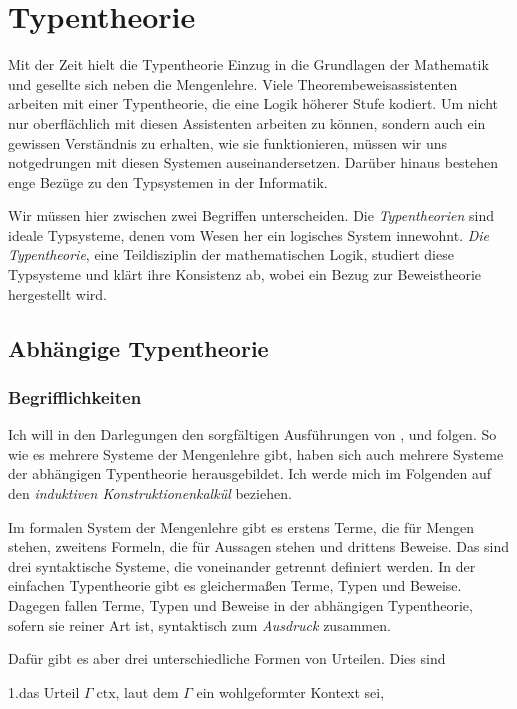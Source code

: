 
\chapter{Typentheorie}

Mit der Zeit hielt die Typentheorie Einzug in die Grundlagen der Mathematik
und gesellte sich neben die Mengenlehre. Viele Theorembeweisassistenten
arbeiten mit einer Typentheorie, die eine Logik höherer Stufe kodiert.
Um nicht nur oberflächlich mit diesen Assistenten arbeiten zu können, sondern
auch ein gewissen Verständnis zu erhalten, wie sie funktionieren, müssen wir
uns notgedrungen mit diesen Systemen auseinandersetzen. Darüber hinaus
bestehen enge Bezüge zu den Typsystemen in der Informatik.

Wir müssen hier zwischen zwei Begriffen unterscheiden. Die \emph{Typentheorien}
sind ideale Typsysteme, denen vom Wesen her ein logisches System innewohnt.
\emph{Die Typentheorie}, eine Teildisziplin der mathematischen Logik, studiert
diese Typsysteme und klärt ihre Konsistenz ab, wobei ein Bezug zur
Beweistheorie hergestellt wird.

\section{Abhängige Typentheorie}

\subsection{Begrifflichkeiten}

Ich will in den Darlegungen den sorgfältigen Ausführungen von
\cite{Avigad}, \cite{Mimram} und \cite{HoTT} folgen. So wie es mehrere
Systeme der Mengenlehre gibt, haben sich auch mehrere Systeme der
abhängigen Typentheorie herausgebildet. Ich werde mich im Folgenden
auf den \emph{induktiven Konstruktionenkalkül} beziehen.

Im formalen System der Mengenlehre gibt es erstens Terme, die für Mengen
stehen, zweitens Formeln, die für Aussagen stehen und drittens Beweise.
Das sind drei syntaktische Systeme, die voneinander getrennt definiert
werden. In der einfachen Typentheorie gibt es gleichermaßen Terme, Typen und
Beweise. Dagegen fallen Terme, Typen und Beweise in der abhängigen
Typentheorie, sofern sie reiner Art ist, syntaktisch zum \emph{Ausdruck}
zusammen.

Dafür gibt es aber drei unterschiedliche Formen von Urteilen. Dies sind

1.\;das Urteil $\Gamma\;\mathrm{ctx}$, laut dem $\Gamma$ ein
wohlgeformter Kontext sei,

